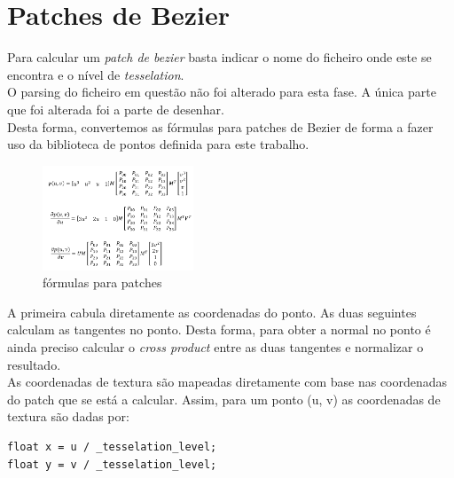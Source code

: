 \documentclass[a4paper]{report}
\begin{document}
\section{Patches de Bezier}
Para calcular um \textit{patch de bezier} basta indicar  o nome do ficheiro onde
este se encontra e o nível de \textit{tesselation}.\\
O parsing do ficheiro em questão não foi alterado para esta fase. A única parte
que foi alterada foi a parte de desenhar.\\
Desta forma, convertemos as fórmulas para patches de Bezier de forma a fazer uso
da biblioteca de pontos definida para este trabalho.\\
\begin{figure}[H]
    \centering 
    \includegraphics[width=0.4\textwidth]{images/formulas_patches.png}  
    \caption{fórmulas para patches}
\end{figure}
A primeira cabula diretamente as coordenadas do ponto. As duas seguintes
calculam as tangentes no ponto. Desta forma, para obter a normal no ponto é
ainda preciso calcular o \textit{cross product} entre as duas tangentes e
normalizar o resultado.\\
As coordenadas de textura são mapeadas diretamente com base nas coordenadas do
patch que se está a calcular. Assim, para um ponto (u, v) as coordenadas de
textura são dadas por:
\begin{lstlisting}
float x = u / _tesselation_level;
float y = v / _tesselation_level;
\end{lstlisting}
\end{document}
